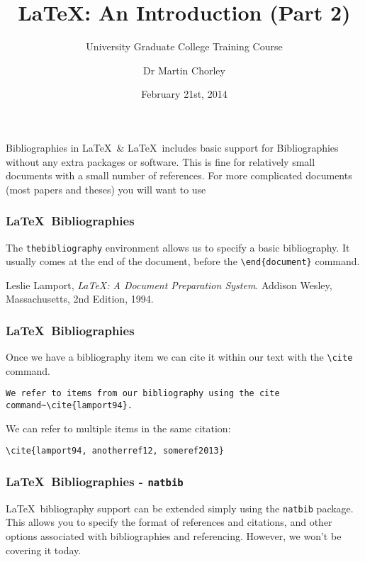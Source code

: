 \documentclass[mathserif]{beamer}
\title{\LaTeX: An Introduction (Part 2)}
\subtitle{University Graduate College Training Course}
\author[Martin Chorley]{Dr Martin Chorley}
\institute[COMSC]{School of Computer Science \& Informatics, Cardiff University}
\date[21/02/14]{February 21st, 2014}
\begin{document}
\begin{frame}{Bibliographies in \LaTeX\ \& \BibTeX}
\vfill
\LaTeX\ includes basic support for Bibliographies without any extra packages or software. This is fine for relatively small documents with a small number of references.
\vfill
For more complicated documents (most papers and theses) you will want to use \BibTeX
\vfill
\end{frame}


\begin{frame}[fragile]
\frametitle{\LaTeX\ Bibliographies}
\vfill
The \texttt{thebibliography} environment allows us to specify a basic bibliography. It usually comes at the end of the document, before the \texttt{{\textbackslash}end\{document\}} command.
\vfill
\begin{LTXexample}[style=latexsty]
\begin{thebibliography}{9}

  Leslie Lamport,
  \emph{\LaTeX: A Document Preparation System}.
  Addison Wesley, Massachusetts,
  2nd Edition,
  1994.

\end{thebibliography}
\end{LTXexample}
\vfill
\end{frame}

\begin{frame}[fragile]
\frametitle{\LaTeX\ Bibliographies}
\vfill
Once we have a bibliography item we can cite it within our text with the \texttt{{\textbackslash}cite} command.
\vfill
\begin{lstlisting}[style=latexsty]
We refer to items from our bibliography using the cite command~\cite{lamport94}.
\end{lstlisting}
\vfill
We can refer to multiple items in the same citation:
\vfill
\begin{lstlisting}[style=latexsty]
\cite{lamport94, anotherref12, someref2013}
\end{lstlisting}
\vfill
\end{frame}


\begin{frame}[fragile]
\frametitle{\LaTeX\ Bibliographies - \texttt{natbib}}
\vfill
\LaTeX\ bibliography support can be extended simply using the \texttt{natbib} package.
\vfill
This allows you to specify the format of references and citations, and other options associated with bibliographies and referencing.
\vfill 
However, we won't be covering it today.
\vfill
\end{frame}
\end{document}
